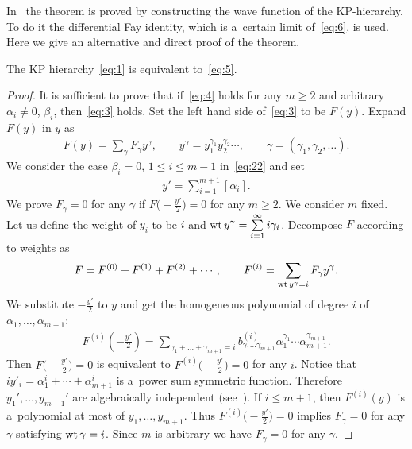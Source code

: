 In~\cite{TT1} the theorem is proved by constructing the wave function of the KP-hierarchy.
To do it the dif\/ferential Fay identity, which is a~certain limit of~\eqref{eq:6}, is used.
Here we give an alternative and direct proof of the theorem.
\begin{proposition}\label{proposition1}
The KP hierarchy~\eqref{eq:1} is equivalent to~\eqref{eq:5}.
\end{proposition}
\begin{proof}
It is suf\/f\/icient to prove that if~\eqref{eq:4} holds for any $m\ge2$ and arbitrary
$\alpha_i\neq0$, $\beta_i$, then~\eqref{eq:3} holds.
Set the left hand side of~\eqref{eq:3} to be $F(y)$.
Expand $F(y)$ in $y$ as
\begin{gather*}%
F(y)=\sum_\gamma F_\gamma y^\gamma,\qquad  y^\gamma=y_1^{\gamma_1}y_2^{\gamma_2}
\cdots,\qquad \gamma=(\gamma_1,\gamma_2,\dots).
\end{gather*}
We consider the case $\beta_i=0$, $1\le i\le m-1$ in~\eqref{eq:22} and set
\begin{gather*}%
y'=\sum_{i=1}^{m+1}[\alpha_i].
\end{gather*}
We prove $F_\gamma=0$ for any $\gamma$ if $F\big({-}\frac{y'}{2}\big)=0$ for any $m\ge2$.
We consider $m$ f\/ixed.
Let us def\/ine the weight of $y_i$ to be $i$ and ${\rm wt}\,y^\gamma=\sum\limits_{i=1}^{\infty}i\gamma_i$.
Decompose $F$ according to weights as
\begin{gather*}
F=F^{(0)}+F^{(1)}+F^{(2)}+\cdots,
\qquad
F^{(i)}=\sum_{{\rm wt}\,y^\gamma=i}F_\gamma y^\gamma.
\end{gather*}
We substitute $-\frac{y'}{2}$ to $y$ and get the homogeneous polynomial of degree $i$ of
$\alpha_1,\dots,\alpha_{m+1}$:
\begin{gather*}%
F^{(i)}\left(-\frac{y'}{2}\right)=\sum_{\gamma_1+\dots+\gamma_{m+1}=i}b^{(i)}_{\gamma_1\dots\gamma_{m+1}}
\alpha_1^{\gamma_1}\cdots\alpha_{m+1}^{\gamma_{m+1}}.
\end{gather*}
Then $F\big({-}\frac{y'}{2}\big)=0$ is equivalent to $F^{(i)}\big({-}\frac{y'}{2}\big)=0$ for any $i$.
Notice that $i y'_i=\alpha_1^i+\cdots+\alpha_{m+1}^i$ is a~power sum symmetric function.
Therefore $y_1',\dots,y_{m+1}'$ are algebraically independent (see~\cite[(2.12)]{Mac}).
If $i\le m+1$, then $F^{(i)}(y)$ is a~polynomial at most of $y_1,\dots,y_{m+1}$.
Thus $F^{(i)}\big({-}\frac{y'}{2}\big)=0$ implies $F_\gamma=0$ for any $\gamma$ satisfying ${\rm wt}\,\gamma=i$.
Since $m$ is arbitrary we have $F_\gamma=0$ for any $\gamma$.
\end{proof}
